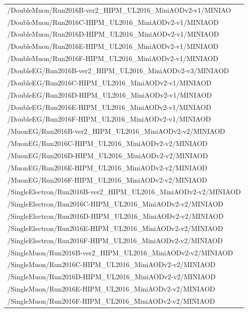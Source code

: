 \begin{table}[h]
\scriptsize
    \centering
    \begin{tabular}{l}
\hline %
/DoubleMuon/Run2016B-ver2\_HIPM\_UL2016\_MiniAODv2-v1/MINIAO \\
/DoubleMuon/Run2016C-HIPM\_UL2016\_MiniAODv2-v1/MINIAOD \\
/DoubleMuon/Run2016D-HIPM\_UL2016\_MiniAODv2-v1/MINIAOD \\
/DoubleMuon/Run2016E-HIPM\_UL2016\_MiniAODv2-v1/MINIAOD \\
/DoubleMuon/Run2016F-HIPM\_UL2016\_MiniAODv2-v1/MINIAOD \\
\hline
/DoubleEG/Run2016B-ver2\_HIPM\_UL2016\_MiniAODv2-v3/MINIAOD \\
/DoubleEG/Run2016C-HIPM\_UL2016\_MiniAODv2-v1/MINIAOD  \\
/DoubleEG/Run2016D-HIPM\_UL2016\_MiniAODv2-v1/MINIAOD \\
/DoubleEG/Run2016E-HIPM\_UL2016\_MiniAODv2-v1/MINIAOD \\
/DoubleEG/Run2016F-HIPM\_UL2016\_MiniAODv2-v1/MINIAOD \\
\hline
/MuonEG/Run2016B-ver2\_HIPM\_UL2016\_MiniAODv2-v2/MINIAOD \\
/MuonEG/Run2016C-HIPM\_UL2016\_MiniAODv2-v2/MINIAOD \\
/MuonEG/Run2016D-HIPM\_UL2016\_MiniAODv2-v2/MINIAOD \\
/MuonEG/Run2016E-HIPM\_UL2016\_MiniAODv2-v2/MINIAOD \\
/MuonEG/Run2016F-HIPM\_UL2016\_MiniAODv2-v2/MINIAOD \\
\hline
/SingleElectron/Run2016B-ver2\_HIPM\_UL2016\_MiniAODv2-v2/MINIAOD \\
/SingleElectron/Run2016C-HIPM\_UL2016\_MiniAODv2-v2/MINIAOD \\
/SingleElectron/Run2016D-HIPM\_UL2016\_MiniAODv2-v2/MINIAOD \\
/SingleElectron/Run2016E-HIPM\_UL2016\_MiniAODv2-v2/MINIAOD \\
/SingleElectron/Run2016F-HIPM\_UL2016\_MiniAODv2-v2/MINIAOD \\
\hline
/SingleMuon/Run2016B-ver2\_HIPM\_UL2016\_MiniAODv2-v2/MINIAOD \\
/SingleMuon/Run2016C-HIPM\_UL2016\_MiniAODv2-v2/MINIAOD \\
/SingleMuon/Run2016D-HIPM\_UL2016\_MiniAODv2-v2/MINIAOD \\
/SingleMuon/Run2016E-HIPM\_UL2016\_MiniAODv2-v2/MINIAOD \\
/SingleMuon/Run2016F-HIPM\_UL2016\_MiniAODv2-v2/MINIAOD \\
\hline
\end{tabular}
\small
    \label{tab:datasets_data_16preVFP}
\end{table}

